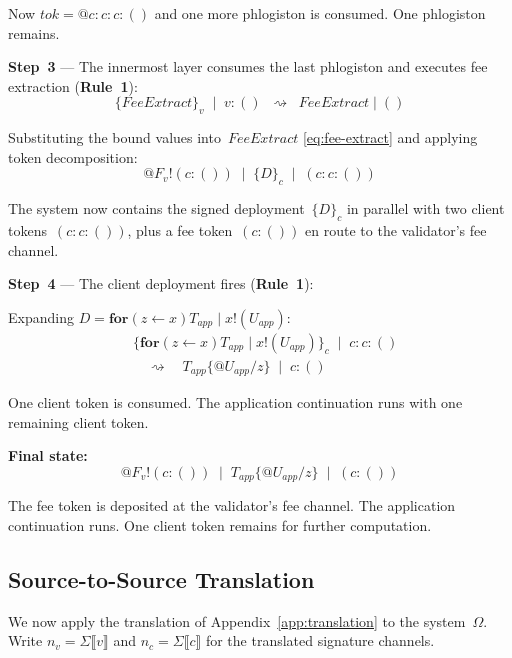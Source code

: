\documentclass[11pt,a4paper]{article}
\makeatletter
\newcommand{\lsem}{\llbracket}
\newcommand{\rsem}{\rrbracket}
\newcommand{\Par}{\mathbin{|}}
\newcommand{\forc}{\mathbf{for}}
\newcommand{\send}[2]{#1 !\!\left( #2 \right)}
\newcommand{\recv}[3]{\forc\!\left( #1 \leftarrow #2 \right) #3}
\newcommand{\quot}[1]{@#1}
\newcommand{\subst}[3]{#1\{#2 / #3\}}
\newcommand{\signed}[2]{\{#1\}_{#2}}
\newcommand{\red}{\rightsquigarrow}
\makeatother
\begin{document}
\noindent
Now $\mathit{tok} = \quot{c : c : c : ()}$ and one more
phlogiston is consumed.  One phlogiston remains.

\bigskip
\noindent
\textbf{Step~3} --- The innermost layer consumes the last
phlogiston and executes fee extraction
(\textbf{Rule~1}):
\[
  \signed{\mathit{FeeExtract}}{v}
  \;\Par\; v : ()
  \;\;\red\;\;
  \mathit{FeeExtract} \Par ()
\]

\noindent
Substituting the bound values into~$\mathit{FeeExtract}$
\eqref{eq:fee-extract} and applying token decomposition:
\begin{equation}
  \send{\quot{F_v}}{c : ()}
  \;\Par\;
  \signed{D}{c}
  \;\Par\;
  (c : c : ())
  \label{eq:after-fee}
\end{equation}

\noindent
The system now contains the signed deployment~$\signed{D}{c}$
in parallel with two client tokens~$(c : c : ())$, plus a
fee token~$(c : ())$ en route to the validator's fee channel.

\bigskip
\noindent
\textbf{Step~4} --- The client deployment fires
(\textbf{Rule~1}):

Expanding $D = \recv{z}{x}{T_{\mathit{app}}} \Par
\send{x}{U_{\mathit{app}}}$:
\begin{align*}
  &\signed{
    \recv{z}{x}{T_{\mathit{app}}}
    \Par \send{x}{U_{\mathit{app}}}
  }{c}
  \;\Par\; c : c : ()
  \\[4pt]
  &\quad\red\quad
  \subst{T_{\mathit{app}}}
    {\quot{U_{\mathit{app}}}}{z}
  \;\Par\; c : ()
\end{align*}

\noindent
One client token is consumed.  The application continuation
runs with one remaining client token.

\bigskip
\noindent
\textbf{Final state:}
\[
  \send{\quot{F_v}}{c : ()}
  \;\Par\;
  \subst{T_{\mathit{app}}}
    {\quot{U_{\mathit{app}}}}{z}
  \;\Par\;
  (c : ())
\]

\noindent
The fee token is deposited at the validator's fee channel.
The application continuation runs.  One client token remains
for further computation.

\subsection{Source-to-Source Translation}
\label{app:ex-translation}

We now apply the translation of
Appendix~\ref{app:translation} to the system~$\Omega$.
Write $n_v = \Sigma\lsem v \rsem$ and
$n_c = \Sigma\lsem c \rsem$ for the translated signature
channels.
\end{document}
